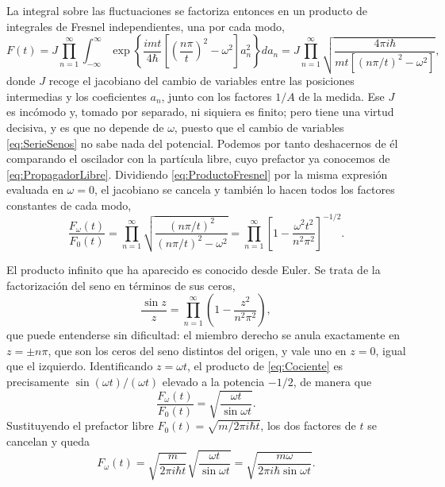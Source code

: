         La integral sobre las fluctuaciones se factoriza entonces en un producto de integrales de Fresnel independientes, una por cada modo,
        \begin{equation}\label{eq:ProductoFresnel}
            F(t) = J \prod_{n=1}^{\infty}\int_{-\infty}^{\infty}\exp\left\{\frac{imt}{4\hbar}\left[\left(\frac{n\pi}{t}\right)^{2}-\omega^{2}\right]a_{n}^{2}\right\}da_{n}
            = J\prod_{n=1}^{\infty}\sqrt{\frac{4\pi i\hbar}{mt\left[\left(n\pi/t\right)^{2}-\omega^{2}\right]}},
        \end{equation}
        donde $J$ recoge el jacobiano del cambio de variables entre las posiciones intermedias y los coeficientes $a_{n}$, junto con los factores $1/A$ de la medida. Ese $J$ es incómodo y, tomado por separado, ni siquiera es finito; pero tiene una virtud decisiva, y es que no depende de $\omega$, puesto que el cambio de variables \eqref{eq:SerieSenos} no sabe nada del potencial. Podemos por tanto deshacernos de él comparando el oscilador con la partícula libre, cuyo prefactor ya conocemos de \eqref{eq:PropagadorLibre}. Dividiendo \eqref{eq:ProductoFresnel} por la misma expresión evaluada en $\omega = 0$, el jacobiano se cancela y también lo hacen todos los factores constantes de cada modo,
        \begin{equation}\label{eq:Cociente}
            \frac{F_{\omega}(t)}{F_{0}(t)} = \prod_{n=1}^{\infty}\sqrt{\frac{\left(n\pi/t\right)^{2}}{\left(n\pi/t\right)^{2}-\omega^{2}}}
            = \prod_{n=1}^{\infty}\left[1 - \frac{\omega^{2}t^{2}}{n^{2}\pi^{2}}\right]^{-1/2} .
        \end{equation}

        El producto infinito que ha aparecido es conocido desde Euler. Se trata de la factorización del seno en términos de sus ceros,
        \begin{equation}\label{eq:ProductoEuler}
            \frac{\sin z}{z} = \prod_{n=1}^{\infty}\left(1 - \frac{z^{2}}{n^{2}\pi^{2}}\right),
        \end{equation}
        que puede entenderse sin dificultad: el miembro derecho se anula exactamente en $z = \pm n\pi$, que son los ceros del seno distintos del origen, y vale uno en $z=0$, igual que el izquierdo. Identificando $z = \omega t$, el producto de \eqref{eq:Cociente} es precisamente $\sin(\omega t)/(\omega t)$ elevado a la potencia $-1/2$, de manera que
        \begin{equation}\label{eq:CocienteFinal}
            \frac{F_{\omega}(t)}{F_{0}(t)} = \sqrt{\frac{\omega t}{\sin\omega t}} .
        \end{equation}
        Sustituyendo el prefactor libre $F_{0}(t) = \sqrt{m/2\pi i\hbar t}$, los dos factores de $t$ se cancelan y queda
        \begin{equation}\label{eq:PrefactorOscilador}
            F_{\omega}(t) = \sqrt{\frac{m}{2\pi i\hbar t}}\sqrt{\frac{\omega t}{\sin\omega t}} = \sqrt{\frac{m\omega}{2\pi i\hbar\sin\omega t}} .
        \end{equation}

